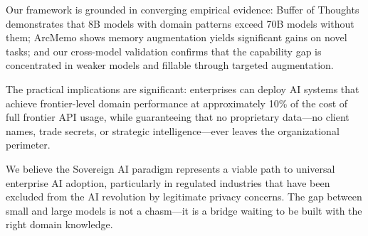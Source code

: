 \documentclass[11pt,a4paper]{article}
\begin{document}
Our framework is grounded in converging empirical evidence: Buffer of Thoughts demonstrates that 8B models with domain patterns exceed 70B models without them; ArcMemo shows memory augmentation yields significant gains on novel tasks; and our cross-model validation confirms that the capability gap is concentrated in weaker models and fillable through targeted augmentation.

The practical implications are significant: enterprises can deploy AI systems that achieve frontier-level domain performance at approximately 10\% of the cost of full frontier API usage, while guaranteeing that no proprietary data---no client names, trade secrets, or strategic intelligence---ever leaves the organizational perimeter.

We believe the Sovereign AI paradigm represents a viable path to universal enterprise AI adoption, particularly in regulated industries that have been excluded from the AI revolution by legitimate privacy concerns. The gap between small and large models is not a chasm---it is a bridge waiting to be built with the right domain knowledge.



\end{document}
